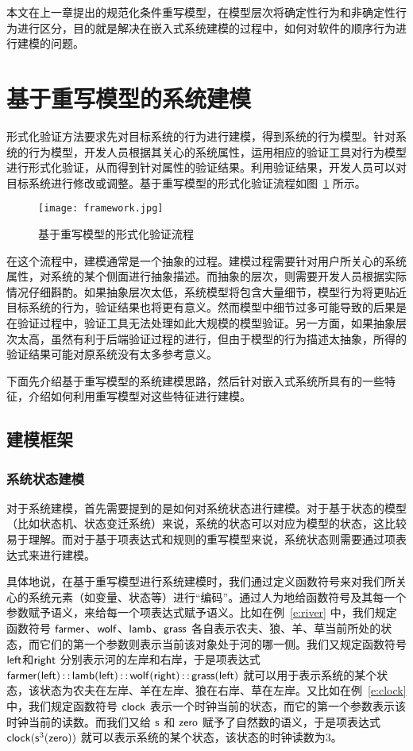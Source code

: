 本文在上一章提出的规范化条件重写模型，在模型层次将确定性行为和非确定性行为进行区分，目的就是解决在嵌入式系统建模的过程中，如何对软件的顺序行为进行建模的问题。

\section{基于重写模型的系统建模}
\label{s:modeling}

形式化验证方法要求先对目标系统的行为进行建模，得到系统的行为模型。针对系统的行为模型，开发人员根据其关心的系统属性，运用相应的验证工具对行为模型进行形式化验证，从而得到针对属性的验证结果。利用验证结果，开发人员可以对目标系统进行修改或调整。基于重写模型的形式化验证流程如图~\ref{f:framework} 所示。

\begin{figure}[ht]
\centering
\texttt{[image: framework.jpg]}
\caption{基于重写模型的形式化验证流程}
\label{f:framework}
\end{figure}

在这个流程中，建模通常是一个抽象的过程。建模过程需要针对用户所关心的系统属性，对系统的某个侧面进行抽象描述。而抽象的层次，则需要开发人员根据实际情况仔细斟酌。如果抽象层次太低，系统模型将包含大量细节，模型行为将更贴近目标系统的行为，验证结果也将更有意义。然而模型中细节过多可能导致的后果是在验证过程中，验证工具无法处理如此大规模的模型验证。另一方面，如果抽象层次太高，虽然有利于后端验证过程的进行，但由于模型的行为描述太抽象，所得的验证结果可能对原系统没有太多参考意义。

下面先介绍基于重写模型的系统建模思路，然后针对嵌入式系统所具有的一些特征，介绍如何利用重写模型对这些特征进行建模。

\subsection{建模框架}

\subsubsection{系统状态建模}
对于系统建模，首先需要提到的是如何对系统状态进行建模。对于基于状态的模型（比如状态机、状态变迁系统）来说，系统的状态可以对应为模型的状态，这比较易于理解。而对于基于项表达式和规则的重写模型来说，系统状态则需要通过项表达式来进行建模。

具体地说，在基于重写模型进行系统建模时，我们通过定义函数符号来对我们所关心的系统元素（如变量、状态等）进行“编码”。通过人为地给函数符号及其每一个参数赋予语义，来给每一个项表达式赋予语义。比如在例~\ref{e:river} 中，我们规定函数符号 $\operatorname{\mathsf{farmer}}$、$\operatorname{\mathsf{wolf}}$、$\operatorname{\mathsf{lamb}}$、$\operatorname{\mathsf{grass}}$ 各自表示农夫、狼、羊、草当前所处的状态，而它们的第一个参数则表示当前该对象处于河的哪一侧。我们又规定函数符号 $\operatorname{\mathsf{left}}$和$\operatorname{\mathsf{right}}$ 分别表示河的左岸和右岸，于是项表达式 $\operatorname{\mathsf{farmer}}(\operatorname{\mathsf{left}}) \operatorname{\mathsf{::}} \operatorname{\mathsf{lamb}}(\operatorname{\mathsf{left}}) \operatorname{\mathsf{::}} \operatorname{\mathsf{wolf}}(\operatorname{\mathsf{right}}) \operatorname{\mathsf{::}} \operatorname{\mathsf{grass}}(\operatorname{\mathsf{left}})$ 就可以用于表示系统的某个状态，该状态为农夫在左岸、羊在左岸、狼在右岸、草在左岸。又比如在例~\ref{e:clock} 中，我们规定函数符号 $\operatorname{\mathsf{clock}}$ 表示一个时钟当前的状态，而它的第一个参数表示该时钟当前的读数。而我们又给 $\operatorname{\mathsf{s}}$ 和 $\operatorname{\mathsf{zero}}$ 赋予了自然数的语义，于是项表达式 $\operatorname{\mathsf{clock}}(\operatorname{\mathsf{s}}^3(\operatorname{\mathsf{zero}}))$ 就可以表示系统的某个状态，该状态的时钟读数为3。

